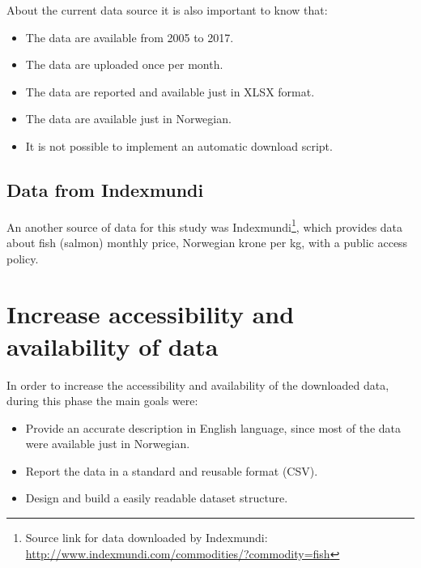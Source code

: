 About the current data source it is also important to know that:
\begin{itemize}
\item The data are available from 2005 to 2017.
\item The data are uploaded once per month.
\item The data are reported and available just in XLSX format.
\item The data are available just in Norwegian.
\item It is not possible to implement an automatic download script.
\end{itemize}

\newpage


\subsection{Data from Indexmundi} 
An another source of data for this study was Indexmundi\footnote{Source link for data downloaded by Indexmundi: \\ \url{http://www.indexmundi.com/commodities/?commodity=fish}}, which provides data about fish (salmon) monthly price, Norwegian krone per kg, with a public access policy.\\

\begin{table}[ht]
     \caption{Data provided from Indexmundi.}
    \label{table: Indemundi_Data} 
\end{table}  

\section{Increase accessibility and availability of data}
In order to increase the accessibility and availability of the downloaded data, during this phase the main goals were:
\vspace{-2mm}
\begin{itemize}
 \setlength{\itemsep}{-5pt}
\item Provide an accurate description in English language, since most of the data were available just in Norwegian.
\item Report the data in a standard and reusable format (CSV).
\item Design and build a easily readable dataset structure.
\end{itemize} 

